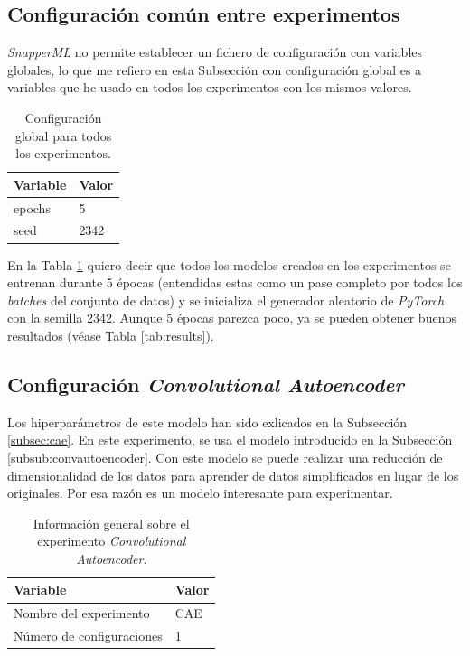 \subsection{Configuración común entre experimentos}

\textit{SnapperML} no permite establecer un fichero de configuración con variables globales, lo que me refiero en esta Subsección con configuración global es a variables que he usado en todos los experimentos con los mismos valores.\\

\setlength{\tabcolsep}{10pt} %
\renewcommand{\arraystretch}{1.5} %

\begin{table}[h]
\centering
\begin{tabular}[c]{m{3cm}m{3cm}}
\hline
\textbf{Variable} & \textbf{Valor} \\ \hline
epochs            & 5              \\
seed              & 2342           \\ \hline
\end{tabular}
\caption{Configuración global para todos los experimentos.}
\label{tab:globalvalues}
\end{table}

En la Tabla \ref{tab:globalvalues} quiero decir que todos los modelos creados en los experimentos se entrenan durante 5 épocas (entendidas estas como un pase completo por todos los \textit{batches} del conjunto de datos) y se inicializa el generador aleatorio de \textit{PyTorch} con la semilla 2342. Aunque 5 épocas parezca poco, ya se pueden obtener buenos resultados (véase Tabla \ref{tab:results}).

\subsection{Configuración \textit{Convolutional Autoencoder}}

Los hiperparámetros de este modelo han sido exlicados en la Subsección \ref{subsec:cae}. En este experimento, se usa el modelo introducido en la Subsección \ref{subsub:convautoencoder}. Con este modelo se puede realizar una reducción de dimensionalidad de los datos para aprender de datos simplificados en lugar de los originales. Por esa razón es un modelo interesante para experimentar.\\

\begin{table}[H]
\centering
\begin{tabular}[c]{m{6cm}m{3cm}}
\hline
\textbf{Variable}                 & \textbf{Valor}  \\ \hline
Nombre del experimento            & CAE             \\
Número de configuraciones         & 1               \\ \hline
\end{tabular}
\caption{Información general sobre el experimento \textit{Convolutional Autoencoder}.}
\label{tab:caeinfo}
\end{table}

